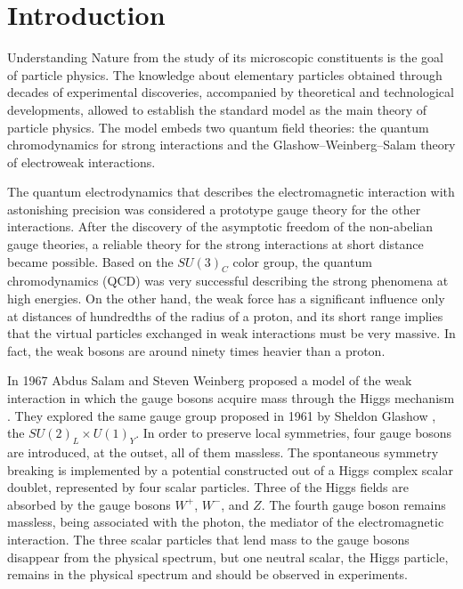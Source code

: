 \chapter{Introduction}

Understanding Nature from the study of its microscopic constituents is the goal of particle physics. The knowledge about elementary particles obtained through decades of experimental discoveries, accompanied by theoretical and technological developments, allowed to establish the standard model \cite{Novaes:1999yn} as the main theory of particle physics. The model embeds two quantum field theories: the quantum chromodynamics \cite{Muta:1998vi} for strong interactions and the Glashow--Weinberg--Salam theory \cite{Bilenky:1982ms} of electroweak interactions.

The quantum electrodynamics \cite{qcdFeynman} that describes the electromagnetic interaction with astonishing precision was considered a prototype gauge theory for the other interactions. After the discovery of the asymptotic freedom of the non-abelian gauge theories, a reliable theory for the strong interactions at short distance became possible. Based on the $SU(3)_C$ color group, the quantum chromodynamics (QCD) was very successful describing the strong phenomena at high energies. On the other hand, the weak force has a significant influence only at distances of hundredths of the radius of a proton, and its short range implies that the virtual particles exchanged in weak interactions must be very massive. In fact, the weak bosons are around ninety times heavier than a proton. 

In 1967 Abdus Salam and Steven Weinberg proposed a model of the weak interaction in which the gauge bosons acquire mass through the Higgs mechanism \cite{Higgs:1966ev, Englert:1964et}. They explored the same gauge group proposed in 1961 by Sheldon Glashow \cite{Glashow:1961tr}, the $SU(2)_L\times U(1)_Y$. In order to preserve local symmetries, four gauge bosons are introduced, at the outset, all of them massless. The spontaneous symmetry breaking is implemented by a potential constructed out of a Higgs complex scalar doublet, represented by four scalar particles. Three of the Higgs fields are absorbed by the gauge bosons $W^+$, $W^-$, and $Z$. The fourth gauge boson remains massless, being associated with the photon, the mediator of the electromagnetic interaction. The three scalar particles that lend mass to the gauge bosons disappear from the physical spectrum, but one neutral scalar, the Higgs particle, remains in the physical spectrum and should be observed in experiments.  
 
